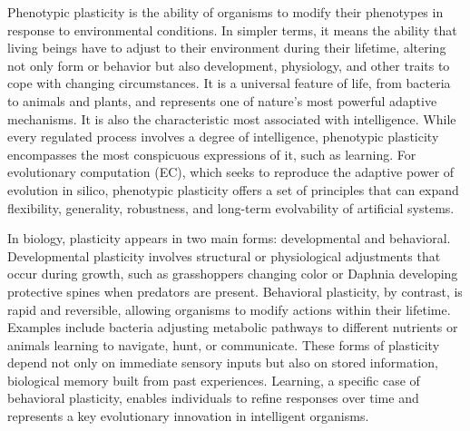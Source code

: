 

Phenotypic plasticity is the ability of organisms to modify their phenotypes in response to environmental conditions.
In simpler terms, it means the ability that living beings have to adjust to their environment during their lifetime,  altering not only form or behavior but also development, physiology, and other traits to cope with changing circumstances.
It is a universal feature of life, from bacteria to animals and plants, and represents one of nature's most powerful adaptive mechanisms.
It is also the characteristic most associated with intelligence.
While every regulated process involves a degree of intelligence, phenotypic plasticity encompasses the most conspicuous expressions of it, such as learning.
For evolutionary computation (EC), which seeks to reproduce the adaptive power of evolution in silico, phenotypic plasticity offers a set of principles that can expand flexibility, generality, robustness, and long-term evolvability of artificial systems.

In biology, plasticity appears in two main forms: developmental and behavioral.
Developmental plasticity involves structural or physiological adjustments that occur during growth, such as grasshoppers changing color or Daphnia developing protective spines when predators are present.
Behavioral plasticity, by contrast, is rapid and reversible, allowing organisms to modify actions within their lifetime.
Examples include bacteria adjusting metabolic pathways to different nutrients or animals learning to navigate, hunt, or communicate.
These forms of plasticity depend not only on immediate sensory inputs but also on stored information, biological memory built from past experiences.
Learning, a specific case of behavioral plasticity, enables individuals to refine responses over time and represents a key evolutionary innovation in intelligent organisms.

